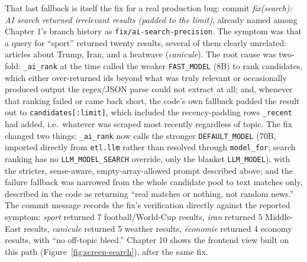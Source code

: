 \begin{sloppypar}
That last fallback is itself the fix for a real production bug: commit \textit{fix(search): AI search returned irrelevant results (padded to the limit)}, already named among Chapter 1's branch history as \texttt{fix/\allowbreak ai-search-precision}. The symptom was that a query for ``sport'' returned twenty results, several of them clearly unrelated: articles about Trump, Iran, and a heatwave (\emph{canicule}). The root cause was two-fold: \texttt{\_ai\_rank} at the time called the weaker \texttt{FAST\_MODEL} (8B) to rank candidates, which either over-returned ids beyond what was truly relevant or occasionally produced output the regex/JSON parse could not extract at all; and, whenever that ranking failed or came back short, the code's own fallback padded the result out to \texttt{candidates[:limit]}, which included the recency-padding rows \texttt{\_recent} had added, i.e.\ whatever was scraped most recently regardless of topic. The fix changed two things: \texttt{\_ai\_rank} now calls the stronger \texttt{DEFAULT\_MODEL} (70B, imported directly from \texttt{etl.llm} rather than resolved through \texttt{model\_for}; search ranking has no \texttt{LLM\_MODEL\_SEARCH} override, only the blanket \texttt{LLM\_MODEL}), with the stricter, sense-aware, empty-array-allowed prompt described above; and the failure fallback was narrowed from the whole candidate pool to text matches only, described in the code as returning ``real matches or nothing, not random news.'' The commit message records the fix's verification directly against the reported symptom: \emph{sport} returned 7 football/World-Cup results, \emph{iran} returned 5 Middle-East results, \emph{canicule} returned 5 weather results, \emph{économie} returned 4 economy results, with ``no off-topic bleed.'' Chapter 10 shows the frontend view built on this path (Figure~\ref{fig:screen-search}), after the same fix.
\end{sloppypar}


